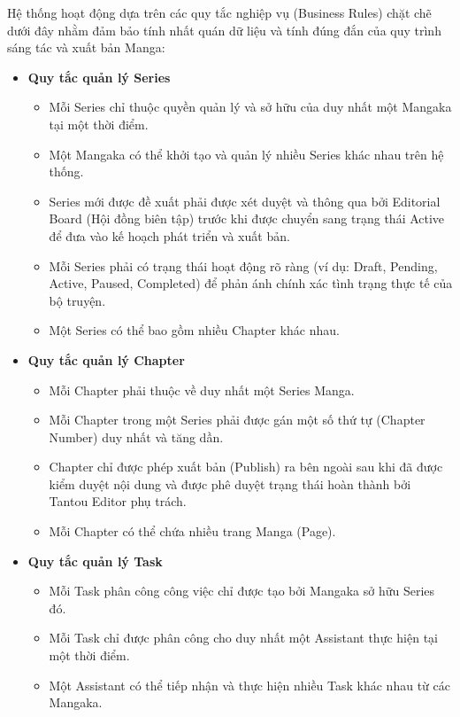 Hệ thống hoạt động dựa trên các quy tắc nghiệp vụ (Business Rules) chặt chẽ dưới đây nhằm đảm bảo tính nhất quán dữ liệu và tính đúng đắn của quy trình sáng tác và xuất bản Manga:

\begin{itemize}
    \item \textbf{Quy tắc quản lý Series}
    \begin{itemize}
        \item Mỗi Series chỉ thuộc quyền quản lý và sở hữu của duy nhất một Mangaka tại một thời điểm.
        \item Một Mangaka có thể khởi tạo và quản lý nhiều Series khác nhau trên hệ thống.
        \item Series mới được đề xuất phải được xét duyệt và thông qua bởi Editorial Board (Hội đồng biên tập) trước khi được chuyển sang trạng thái Active để đưa vào kế hoạch phát triển và xuất bản.
        \item Mỗi Series phải có trạng thái hoạt động rõ ràng (ví dụ: Draft, Pending, Active, Paused, Completed) để phản ánh chính xác tình trạng thực tế của bộ truyện.
        \item Một Series có thể bao gồm nhiều Chapter khác nhau.
    \end{itemize}
    \item \textbf{Quy tắc quản lý Chapter}
    \begin{itemize}
        \item Mỗi Chapter phải thuộc về duy nhất một Series Manga.
        \item Mỗi Chapter trong một Series phải được gán một số thứ tự (Chapter Number) duy nhất và tăng dần.
        \item Chapter chỉ được phép xuất bản (Publish) ra bên ngoài sau khi đã được kiểm duyệt nội dung và được phê duyệt trạng thái hoàn thành bởi Tantou Editor phụ trách.
        \item Mỗi Chapter có thể chứa nhiều trang Manga (Page).
    \end{itemize}
    \item \textbf{Quy tắc quản lý Task}
    \begin{itemize}
        \item Mỗi Task phân công công việc chỉ được tạo bởi Mangaka sở hữu Series đó.
        \item Mỗi Task chỉ được phân công cho duy nhất một Assistant thực hiện tại một thời điểm.
        \item Một Assistant có thể tiếp nhận và thực hiện nhiều Task khác nhau từ các Mangaka.

\end{itemize}
\end{itemize}

